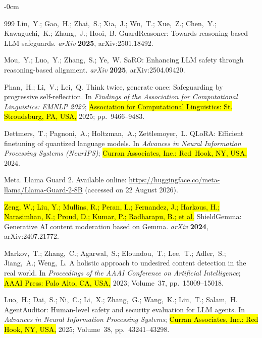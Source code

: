 \documentclass[superintelligence,article,accept,moreauthors]{Definitions/mdpi}
\begin{document}
\begin{adjustwidth}{-\extralength}{0cm}
{\begin{thebibliography}{999}
Liu,~Y.; Gao,~H.; Zhai,~S.; Xia,~J.; Wu,~T.; Xue,~Z.; Chen,~Y.; Kawaguchi,~K.; Zhang,~J.; Hooi,~B.
{GuardReasoner}: Towards reasoning-based {LLM} safeguards.
{\em arXiv} {\bf 2025}, arXiv:2501.18492.

Mou,~Y.; Luo,~Y.; Zhang,~S.; Ye,~W.
{SaRO}: Enhancing {LLM} safety through reasoning-based alignment.
{\em arXiv} {\bf 2025}, arXiv:2504.09420.

Phan,~H.; Li,~V.; Lei,~Q.
Think twice, generate once: Safeguarding by progressive self-reflection.
In {\em Findings of the Association for Computational Linguistics: EMNLP 2025}; \hl{Association for Computational Linguistics: St. Stroudsburg, PA, USA,} 2025; pp.~9466--9483.

Dettmers,~T.; Pagnoni,~A.; Holtzman,~A.; Zettlemoyer,~L.
{QLoRA}: Efficient finetuning of quantized language models.
In {\em Advances in Neural Information Processing Systems (NeurIPS)}; \hl{Curran Associates, Inc.: Red~Hook, NY, USA,} 2024.

Meta. {Llama Guard 2}. Available online: \url{https://huggingface.co/meta-llama/Llama-Guard-2-8B} (accessed on 22 August 2026).



\hl{Zeng, W.; Liu, Y.; Mullins, R.; Peran, L.; Fernandez, J.; Harkous, H.; Narasimhan, K.; Proud, D.; Kumar, P.; Radharapu, B.; et al.}
{ShieldGemma}: Generative {AI} content moderation based on {Gemma}.
{\em arXiv} {\bf 2024}, arXiv:2407.21772.

Markov,~T.; Zhang,~C.; Agarwal,~S.; Eloundou,~T.; Lee,~T.; Adler,~S.; Jiang,~A.; Weng,~L.
A holistic approach to undesired content detection in the real world.
In {\em Proceedings of the AAAI Conference on Artificial Intelligence}; \hl{AAAI Press: Palo Alto, CA, USA,} 2023; Volume~37, pp.~15009--15018.


Luo,~H.; Dai,~S.; Ni,~C.; Li,~X.; Zhang,~G.; Wang,~K.; Liu,~T.; Salam,~H.
{AgentAuditor}: Human-level safety and security evaluation for {LLM} agents.
In {\em Advances in Neural Information Processing Systems}; \hl{Curran Associates, Inc.: Red Hook, NY, USA,} {2025}; Volume~38, pp.~43241--43298.


\end{thebibliography}}
\end{adjustwidth}
\end{document}
